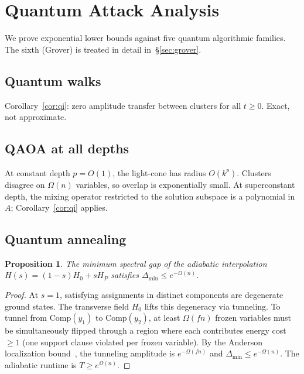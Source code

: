 \documentclass[11pt]{article}
\newtheorem{proposition}[theorem]{Proposition}
\begin{document}
\section{Quantum Attack Analysis}\label{sec:quantum}

We prove exponential lower bounds against five quantum algorithmic families.  The sixth (Grover) is treated in detail in~\S\ref{sec:grover}.


\subsection{Quantum walks}
Corollary~\ref{cor:qi}: zero amplitude transfer between clusters for all $t \geq 0$.  Exact, not approximate.


\subsection{QAOA at all depths}
At constant depth $p = O(1)$, the light-cone has radius $O(k^p)$.  Clusters disagree on $\Omega(n)$ variables, so overlap is exponentially small.  At superconstant depth, the mixing operator restricted to the solution subspace is a polynomial in $A$; Corollary~\ref{cor:qi} applies.


\subsection{Quantum annealing}

\begin{proposition}\label{prop:anneal}
The minimum spectral gap of the adiabatic interpolation $H(s) = (1-s)H_0 + sH_P$ satisfies $\Delta_{\min} \leq e^{-\Omega(n)}$.
\end{proposition}

\begin{proof}
At $s = 1$, satisfying assignments in distinct components are degenerate ground states.  The transverse field $H_0$ lifts this degeneracy via tunneling.  To tunnel from $\mathrm{Comp}(y_1)$ to $\mathrm{Comp}(y_2)$, at least $\Omega(fn)$ frozen variables must be simultaneously flipped through a region where each contributes energy cost $\geq 1$ (one support clause violated per frozen variable).  By the Anderson localization bound~\cite{AKR10}, the tunneling amplitude is $e^{-\Omega(fn)}$ and $\Delta_{\min} \leq e^{-\Omega(n)}$.  The adiabatic runtime is $T \geq e^{\Omega(n)}$.
\end{proof}
\end{document}
